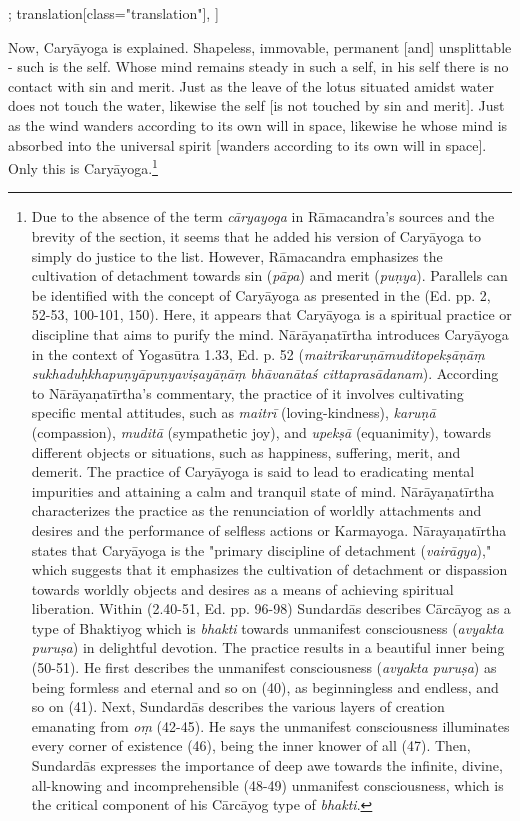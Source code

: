 \begin{alignment}[
  texts=edition[class="edition"];
  translation[class="translation"],
  ]
\begin{translation}
\begin{tlate}[p18_01]
       Now, Caryāyoga is explained. Shapeless, immovable, permanent [and] unsplittable - such is the self. Whose mind remains steady in such a self, in his self there is no contact with sin and merit. Just as the leave of the lotus situated amidst water does not touch the water, likewise the self [is not touched by sin and merit]. Just as the wind wanders according to its own will in space, likewise he whose mind is absorbed into the universal spirit [wanders according to its own will in space]. Only this is Caryāyoga.\footnote{Due to the absence of the term \textit{cāryayoga} in Rāmacandra's sources and the brevity of the section, it seems that he added his version of Caryāyoga to simply do justice to the list. However, Rāmacandra emphasizes the cultivation of detachment towards sin (\textit{pāpa}) and merit (\textit{puṇya}). Parallels can be identified with the concept of Caryāyoga as presented in the  (Ed. pp. 2, 52-53, 100-101, 150). Here, it appears that Caryāyoga is a spiritual practice or discipline that aims to purify the mind. Nārāyaṇatīrtha introduces Caryāyoga in the context of Yogasūtra 1.33, Ed. p. 52 (\textit{maitrīkaruṇāmuditopekṣāṇāṃ sukhaduḥkhapuṇyāpuṇyaviṣayāṇāṃ bhāvanātaś cittaprasādanam}). According to Nārāyaṇatīrtha's commentary, the practice of it involves cultivating specific mental attitudes, such as \textit{maitrī} (loving-kindness), \textit{karuṇā} (compassion), \textit{muditā} (sympathetic joy), and \textit{upekṣā} (equanimity), towards different objects or situations, such as happiness, suffering, merit, and demerit. The practice of Caryāyoga is said to lead to eradicating mental impurities and attaining a calm and tranquil state of mind. Nārāyaṇatīrtha characterizes the practice as the renunciation of worldly attachments and desires and the performance of selfless actions or Karmayoga. Nārayaṇatīrtha states that Caryāyoga is the "primary discipline of detachment (\textit{vairāgya})," which suggests that it emphasizes the cultivation of detachment or dispassion towards worldly objects and desires as a means of achieving spiritual liberation. Within  (2.40-51, Ed. pp. 96-98) Sundardās describes Cārcāyog as a type of Bhaktiyog which is \textit{bhakti} towards unmanifest consciousness (\textit{avyakta puruṣa}) in delightful devotion. The practice results in a beautiful inner being (50-51). He first describes the unmanifest consciousness (\textit{avyakta puruṣa}) as being formless and eternal and so on (40), as beginningless and endless, and so on (41). Next, Sundardās describes the various layers of creation emanating from \textit{oṃ} (42-45). He says the unmanifest consciousness illuminates every corner of existence (46), being the inner knower of all (47). Then, Sundardās expresses the importance of deep awe towards the infinite, divine, all-knowing and incomprehensible (48-49) unmanifest consciousness, which is the critical component of his Cārcāyog type of \textit{bhakti}.}
       \flushpage
     \end{tlate}
   \end{translation}
 \end{alignment}
 \pagebreak %
